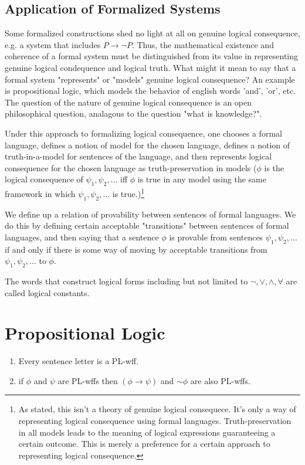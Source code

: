 \documentclass[nobib,notoc]{tufte-handout}
\begin{document}
\subsection{Application of Formalized Systems}
Some formalized constructions shed no light at all on genuine logical consequence, e.g. a system that includes \(P\rightarrow\neg P\). Thus, the mathematical existence and coherence of a formal system must be distinguished from its value in representing genuine logical condequence and logical truth. What might it mean to say that a formal system "represents" or "models" genuine logical consequence? An example is propositional logic, which models the behavior of english words 'and', 'or', etc. The question of the nature of genuine logical consequence is an open philosophical question, analagous to the question "what is knowledge?". 
\begin{defi}
	Under this approach to formalizing logical consequence, one chooses a formal language, defines a notion of model for the chosen language, defines a notion of truth-in-a-model for sentences of the language, and then represents logical consequence for the chosen language as truth-preservation in models (\(\phi\) is the logical consequence of \(\psi_1,\psi_2,\ldots\) iff \(\phi\) is true in any model using the same framework in which \(\psi_1,\psi_2,\ldots\) is true.)\footnote{As stated, this isn't a theory of genuine logical consequece. It's only a way of representing logical consequence using formal languages. Truth-preservation in all models leads to the meaning of logical expressions guaranteeing a certain outcome. This is merely a preference for a certain approach to representing logical consequence.}
\end{defi}
\begin{defi}
	We define up a relation of provability between sentences of formal languages. We do this by defining certain acceptable "transitions" between sentences of formal languages, and then saying that a sentence \(\phi\) is provable from sentences \(\psi_1,\psi_2,\ldots\) if and only if there is some way of moving by acceptable transitions from \(\psi_1,\psi_2,\ldots\) to \(\phi\).
\end{defi}
\begin{defi}
	The words that construct logical forms including but not limited to \(\neg, \vee, \wedge,\forall\) are called logical constants.
\end{defi}
\section{Propositional Logic}
\begin{defi}
	\begin{enumerate}
		Syntactic inductive definition for wffs:
		\item Every sentence letter is a PL-wff.
		\item if \(\phi\) and \(\psi\) are PL-wffs then \((\phi\rightarrow\psi)\) and \(\sim\phi\) are also PL-wffs.
	\end{enumerate}
\end{defi}
\end{document}

